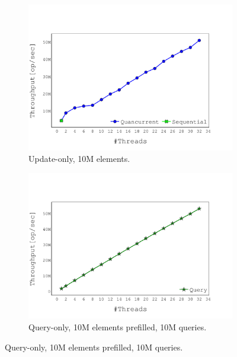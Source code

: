 \begin{figure}[h] %
\centering
    \begin{subfigure}[]{0.49\textwidth}
        \centering
        \includegraphics[width=\textwidth,trim={0cm 0cm 1.9cm 2.6cm},clip] {graphics/graphs/throughput/oracle_Quancurrent_blocking_numa_update_k4096_b16_keys10M_Tup32_runs15_16-08-2022_05-29-07.pdf}
        \caption{Update-only, 10M elements.}
        \label{fig:update_only_speedup}
    \end{subfigure}
    \begin{subfigure}[]{0.49\textwidth}
        \centering
        \includegraphics[width=\textwidth,trim={0cm 0cm 1.9cm 2.6cm},clip] {graphics/graphs/throughput/oracle_Quancurrent_blocking_numa_query_k4096_b16_keys10M_Tup32_runs15_prefill10M_prefillT1_16-08-2022_05-38-28.pdf}
        \caption{Query-only, 10M elements prefilled, 10M queries.}
        \label{fig:query_only_throughput}
    \end{subfigure}


\end{figure}
